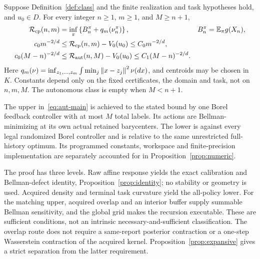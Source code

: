 \begin{theorem}\label{thm:main}
Suppose Definition~\ref{def:class} and the finite realization and task hypotheses hold, and $u_0\in D$. For every integer $n\ge1$, $m\ge1$, and $M\ge n+1$,
\begin{align}
 \mathcal R_{\rm cp}(n,m)
 &=\inf_\pi\left\{B_n^\pi+q_m(\nu_n^\pi)\right\},
 &B_n^\pi&=\mathbb E_\pi g(X_n),\label{eq:cp-exact}\\
 c_0m^{-2/d}&\le\mathcal R_{\rm cp}(n,m)-V_0(u_0)
 \le C_0m^{-2/d},\label{eq:cp-main}\\
 c_0(M-n)^{-2/d}&\le\mathcal R_{\rm aut}(n,M)-V_0(u_0)
 \le C_1(M-n)^{-2/d}.\label{eq:aut-main}
\end{align}
Here $q_m(\nu)=\inf_{z_1,\ldots,z_m}\int\min_j\left\lVert x-z_j\right\rVert^2\nu(dx)$, and centroids may be chosen in $K$. Constants depend only on the fixed certificates, the domain and task, not on $n,m,M$. The autonomous class is empty when $M<n+1$.

The upper in~\eqref{eq:aut-main} is achieved to the stated bound by one Borel feedback controller with at most $M$ total labels. Its actions are Bellman-minimizing at its own actual retained barycenters. The lower is against every legal randomized Borel controller and is relative to the same unrestricted full-history optimum. Its programmed constants, workspace and finite-precision implementation are separately accounted for in Proposition~\ref{prop:numeric}.
\end{theorem}

\begin{remark}\label{rem:hierarchy}
The proof has three levels. Raw affine response yields the exact calibration and Bellman-defect identity, Proposition~\ref{prop:identity}; no stability or geometry is used. Acquired density and terminal task curvature yield the all-policy lower. For the matching upper, acquired overlap and an interior buffer supply summable Bellman sensitivity, and the global grid makes the recursion executable. These are sufficient conditions, not an intrinsic necessary-and-sufficient classification. The overlap route does not require a same-report posterior contraction or a one-step Wasserstein contraction of the acquired kernel. Proposition~\ref{prop:expansive} gives a strict separation from the latter requirement.
\end{remark}

